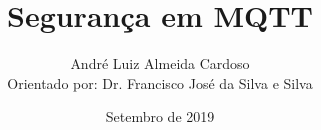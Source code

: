\title[Segurança MQTT]{Segurança em MQTT} 
\author[A.C. André Luiz]{André Luiz Almeida Cardoso \\ Orientado por: Dr. Francisco José da Silva e Silva} 
\date{Setembro de 2019}

